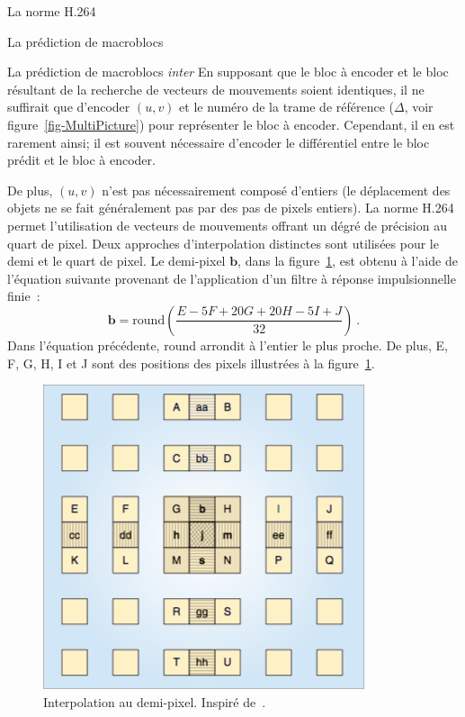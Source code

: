 \documentclass[letterpaper, twoside, 12pt,memoire]{thETS}
\begin{document}
\begin{chapter}{La norme H.264}
\begin{section}{La prédiction de macroblocs}
\begin{subsection}{La prédiction de macroblocs \textit{inter}}
En supposant que le bloc à encoder et le bloc résultant de la recherche de
vecteurs de mouvements soient identiques, il ne suffirait que d'encoder
$(u,v)$ et le numéro de la trame de référence ($\Delta$, voir
figure~\ref{fig-MultiPicture}) pour représenter le bloc à encoder. Cependant, il
en est rarement ainsi; il est souvent nécessaire d'encoder le différentiel entre
le bloc prédit et le bloc à encoder.

De plus, $(u,v)$ n'est pas nécessairement composé d'entiers (le déplacement des
objets ne se fait généralement pas par des pas de pixels entiers). La norme
H.264 permet l'utilisation de vecteurs de mouvements offrant un dégré de
précision au quart de pixel. Deux approches d'interpolation distinctes sont
utilisées pour le demi et le quart de pixel. Le demi-pixel $\mathbf{b}$, dans la
figure~\ref{fig-HalfPel}, est obtenu à l'aide de l'équation suivante provenant
de l'application d'un filtre à réponse impulsionnelle finie~:
\begin{equation}
\mathbf{b} = \text{round} \left(\frac{E - 5F + 20G + 20H - 5I + J}{32}
\right)\:.
\label{eq-DemiPixel}
\end{equation}
Dans l'équation précédente, round arrondit à l'entier le plus proche. De
plus, E, F, G, H, I et J sont des positions des pixels illustrées à la
figure~\ref{fig-HalfPel}. 

\begin{figure}[htb]
\centering
\includegraphics[scale=0.5]{images/HalfPel.png}
\caption{Interpolation au demi-pixel. Inspiré de~\cite{richardson2003}.}
\label{fig-HalfPel}
\end{figure}


\end{subsection}
\end{section}
\end{chapter}
\end{document}
